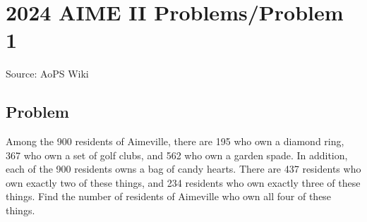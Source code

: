\documentclass[12pt]{article}
\begin{document}
\section*{{2024 AIME II Problems/Problem 1}}
Source: AoPS Wiki

\subsection*{Problem}
Among the 900 residents of Aimeville, there are 195 who own a diamond ring, 367 who own a set of golf clubs, and 562 who own a garden spade. In addition, each of the 900 residents owns a bag of candy hearts. There are 437 residents who own exactly two of these things, and 234 residents who own exactly three of these things. Find the number of residents of Aimeville who own all four of these things.
\end{document}
